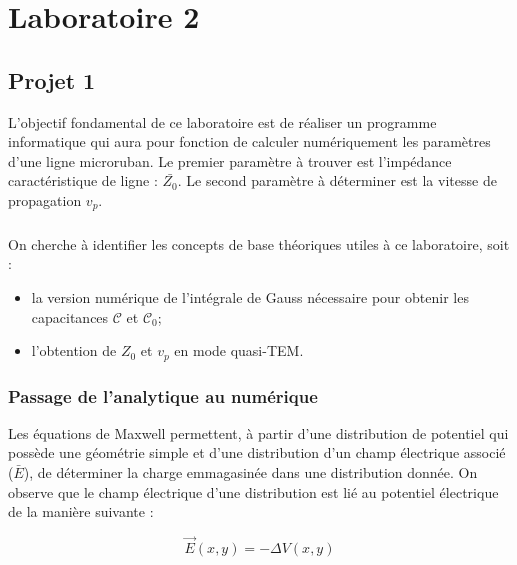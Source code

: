 



\label{s:experimentation}
\chapter{Laboratoire 2}
\section{Projet 1}

L'objectif fondamental de ce laboratoire est de réaliser un programme informatique qui aura pour fonction de calculer numériquement les paramètres d'une ligne microruban. Le premier paramètre à trouver est l'impédance caractéristique de ligne : $\bar{Z_0}$. Le second paramètre à déterminer est la vitesse de propagation $v_p$.

\paragraph{}
On cherche à identifier les concepts de base théoriques utiles à ce laboratoire, soit :

\begin{itemize}
\item la version numérique de l'intégrale de Gauss nécessaire pour obtenir les capacitances $\mathcal{C}$ et $\mathcal{C}_0$;
\item l'obtention de $Z_0$ et $v_p$ en mode quasi-TEM.
\end{itemize}

\subsection{Passage de l'analytique au numérique}
Les équations de Maxwell permettent, à partir d'une distribution de potentiel qui possède une géométrie simple et d'une distribution d'un champ électrique associé ($\bar{E}$), de déterminer la charge emmagasinée dans une distribution donnée. On observe que le champ électrique d'une distribution est lié au potentiel électrique de la manière suivante :

\begin{equation}
	\vec{E}(x,y) = - \Delta V(x,y)
\end{equation}

